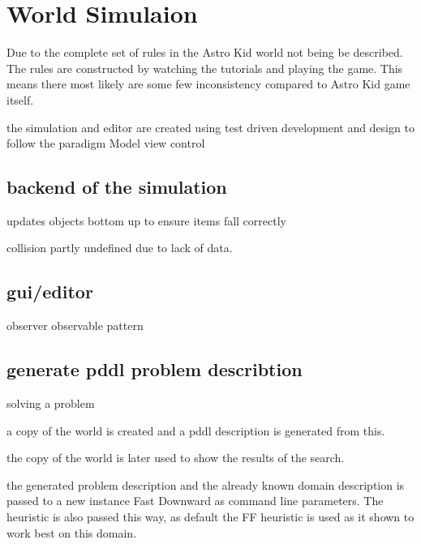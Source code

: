 \section{World Simulaion}
	Due to the complete set of rules in the Astro Kid world not being be described. The rules are constructed by watching the tutorials and playing the game. This means there most likely are some few inconsistency compared to Astro Kid game itself.



	the simulation and editor are created using test driven development and design to follow the paradigm Model view control 

	\subsection{backend of the simulation}
	
	
	updates objects bottom up to ensure items fall correctly
	
	
	collision partly undefined due to lack of data.
	
	\subsection{gui/editor}
	observer observable pattern
	
	\subsection{generate pddl problem describtion}
	
	
	solving a problem
	
	a copy of the world is created and a pddl description is generated from this.
	
	
	the copy of the world is later used to show the results of the search.
	
	
	the generated problem description and the already known domain description is passed to a new instance Fast Downward as command line parameters. The heuristic is also passed this way, as default the FF heuristic is used as it shown to work best on this domain.